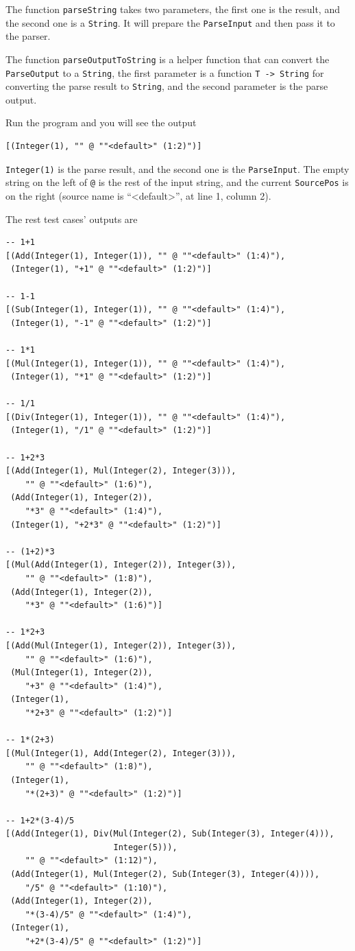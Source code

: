 The function \texttt{parseString} takes two parameters, the first one is the result, and the second one is a \texttt{String}. It will prepare the \texttt{ParseInput} and then pass it to the parser.

The function \texttt{parseOutputToString} is a helper function that can convert the \texttt{ParseOutput} to a \texttt{String}, the first parameter is a function \texttt{T -> String} for converting the parse result to \texttt{String}, and the second parameter is the parse output.

Run the program and you will see the output

\begin{lstlisting}
[(Integer(1), "" @ ""<default>" (1:2)")]
\end{lstlisting}

\texttt{Integer(1)} is the parse result, and the second one is the \texttt{ParseInput}. The empty string on the left of \texttt{@} is the rest of the input string, and the current \texttt{SourcePos} is on the right (source name is ``<default>'', at line 1, column 2).

The rest test cases' outputs are

\begin{lstlisting}[language={}]
-- 1+1
[(Add(Integer(1), Integer(1)), "" @ ""<default>" (1:4)"),
 (Integer(1), "+1" @ ""<default>" (1:2)")]

-- 1-1
[(Sub(Integer(1), Integer(1)), "" @ ""<default>" (1:4)"),
 (Integer(1), "-1" @ ""<default>" (1:2)")]

-- 1*1
[(Mul(Integer(1), Integer(1)), "" @ ""<default>" (1:4)"),
 (Integer(1), "*1" @ ""<default>" (1:2)")]

-- 1/1
[(Div(Integer(1), Integer(1)), "" @ ""<default>" (1:4)"),
 (Integer(1), "/1" @ ""<default>" (1:2)")]

-- 1+2*3
[(Add(Integer(1), Mul(Integer(2), Integer(3))),
    "" @ ""<default>" (1:6)"),
 (Add(Integer(1), Integer(2)),
    "*3" @ ""<default>" (1:4)"),
 (Integer(1), "+2*3" @ ""<default>" (1:2)")]

-- (1+2)*3
[(Mul(Add(Integer(1), Integer(2)), Integer(3)),
    "" @ ""<default>" (1:8)"),
 (Add(Integer(1), Integer(2)),
    "*3" @ ""<default>" (1:6)")]

-- 1*2+3
[(Add(Mul(Integer(1), Integer(2)), Integer(3)),
    "" @ ""<default>" (1:6)"),
 (Mul(Integer(1), Integer(2)),
    "+3" @ ""<default>" (1:4)"),
 (Integer(1),
    "*2+3" @ ""<default>" (1:2)")]

-- 1*(2+3)
[(Mul(Integer(1), Add(Integer(2), Integer(3))),
    "" @ ""<default>" (1:8)"),
 (Integer(1),
    "*(2+3)" @ ""<default>" (1:2)")]

-- 1+2*(3-4)/5
[(Add(Integer(1), Div(Mul(Integer(2), Sub(Integer(3), Integer(4))),
                      Integer(5))),
    "" @ ""<default>" (1:12)"),
 (Add(Integer(1), Mul(Integer(2), Sub(Integer(3), Integer(4)))),
    "/5" @ ""<default>" (1:10)"),
 (Add(Integer(1), Integer(2)),
    "*(3-4)/5" @ ""<default>" (1:4)"),
 (Integer(1),
    "+2*(3-4)/5" @ ""<default>" (1:2)")]
\end{lstlisting}

